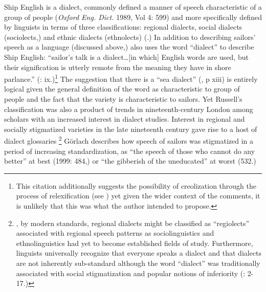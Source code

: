 Ship English is a dialect, commonly defined a manner of speech characteristic of a group of people (\textit{Oxford Eng. Dict.} 1989, Vol 4: 599) and more specifically defined by linguists in terms of three classifications: regional dialects, social dialects (sociolects,) and ethnic dialects (ethnolects) (\citealt{WolframSchilling-Estes2016}.) In addition to describing sailors’ speech as a language (discussed above,) \citet{Russell1883} also uses the word “dialect” to describe Ship English: “sailor’s talk is a dialect…[in which] English words are used, but their signification is utterly remote from the meaning they have in shore parlance.” (\citealt{Russell1883}: ix.)\footnote{This citation additionally suggests the possibility of creolization through the process of relexification (see \citealt{Thompson1961}) yet given the wider context of the comments, it is unlikely that this was what the author intended to propose.}  The suggestion that there is a “sea dialect” (\citealt{Russell1883}, p xiii) is entirely logical given the general definition of the word as characteristic to group of people and the fact that the variety is characteristic to sailors. Yet Russell’s classification was also a product of trends in nineteenth-century London among scholars with an increased interest in dialect studies. Interest in regional and socially stigmatized varieties in the late nineteenth century gave rise to a host of dialect glossaries \footnote{, by modern standards, regional dialects might be classified as “regiolects”  associated with regional speech patterns as sociolinguistics and ethnolinguistics had yet to become established fields of study. Furthermore, linguists universally recognize that everyone speaks a dialect and that dialects are not inherently sub-standard although the word “dialect” was traditionally associated with social stigmatization and popular notions of inferiority (\citealt{WolframSchilling-Estes2016}: 2-17.)} \textstylereferencetext{} Görlach describes how speech of sailors was stigmatized in a period of increasing standardization, as “the speech of those who cannot do any better” at best (1999: 484,) or “the gibberish of the uneducated” at worst (532.)

